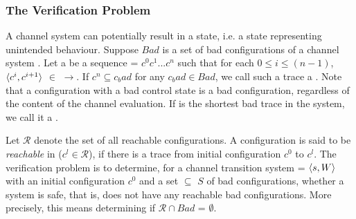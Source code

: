 \subsubsection{The Verification Problem}
A channel system can potentially result in a  state, i.e. a state representing unintended behaviour. Suppose $Bad$ is a set of bad configurations of a channel system . Let a  be a sequence  = $c^0c^1...c^n$ such that for each $0 \leq i \leq (n-1)$, $\langle c^i,c^{i+1}\rangle$ $\in$ $\rightarrow$. If $c^n \subseteq c_bad$ for any $c_bad \in Bad$, we call such a trace a . Note that a configuration with a bad control state is a bad configuration, regardless of the content of the channel evaluation. If  is the shortest bad trace in the system, we call it a .

Let $\mathcal{R}$ denote the set of all reachable configurations. A configuration  is said to be \emph{reachable} in  ($c^l \in \mathcal{R}$), if there is a trace from initial configuration $c^0$ to $c^l$. The verification problem is to determine, for a channel transition system  = $\langle s,W\rangle$ with an initial configuration $c^0$ and a set  $\subseteq$ $S$ of bad configurations, whether a system is safe, that is, does not have any reachable bad configurations. More precisely, this means determining if $\mathcal{R} \cap Bad$  = $\emptyset$.







